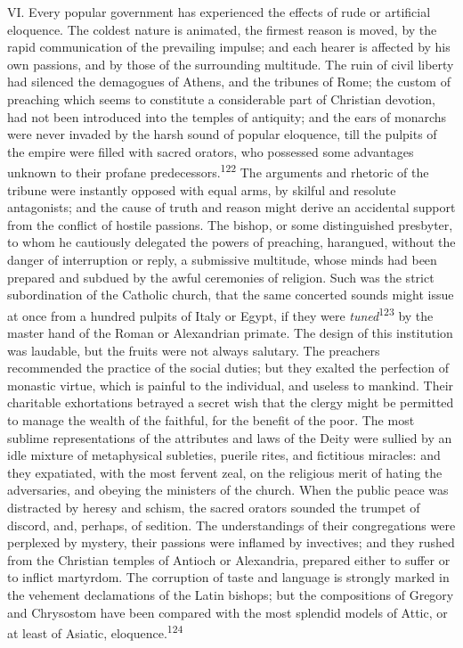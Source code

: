 
VI. Every popular government has experienced the effects of rude or
artificial eloquence. The coldest nature is animated, the firmest
reason is moved, by the rapid communication of the prevailing impulse;
and each hearer is affected by his own passions, and by those of the
surrounding multitude. The ruin of civil liberty had silenced the
demagogues of Athens, and the tribunes of Rome; the custom of preaching
which seems to constitute a considerable part of Christian devotion,
had not been introduced into the temples of antiquity; and the ears of
monarchs were never invaded by the harsh sound of popular eloquence,
till the pulpits of the empire were filled with sacred orators, who
possessed some advantages unknown to their profane predecessors.\textsuperscript{122}
The arguments and rhetoric of the tribune were instantly opposed with
equal arms, by skilful and resolute antagonists; and the cause of truth
and reason might derive an accidental support from the conflict of
hostile passions. The bishop, or some distinguished presbyter, to whom
he cautiously delegated the powers of preaching, harangued, without the
danger of interruption or reply, a submissive multitude, whose minds
had been prepared and subdued by the awful ceremonies of religion. Such
was the strict subordination of the Catholic church, that the same
concerted sounds might issue at once from a hundred pulpits of Italy or
Egypt, if they were \textit{tuned}\textsuperscript{123} by the master hand of the Roman or
Alexandrian primate. The design of this institution was laudable, but
the fruits were not always salutary. The preachers recommended the
practice of the social duties; but they exalted the perfection of
monastic virtue, which is painful to the individual, and useless to
mankind. Their charitable exhortations betrayed a secret wish that the
clergy might be permitted to manage the wealth of the faithful, for the
benefit of the poor. The most sublime representations of the attributes
and laws of the Deity were sullied by an idle mixture of metaphysical
subleties, puerile rites, and fictitious miracles: and they expatiated,
with the most fervent zeal, on the religious merit of hating the
adversaries, and obeying the ministers of the church. When the public
peace was distracted by heresy and schism, the sacred orators sounded
the trumpet of discord, and, perhaps, of sedition. The understandings
of their congregations were perplexed by mystery, their passions were
inflamed by invectives; and they rushed from the Christian temples of
Antioch or Alexandria, prepared either to suffer or to inflict
martyrdom. The corruption of taste and language is strongly marked in
the vehement declamations of the Latin bishops; but the compositions of
Gregory and Chrysostom have been compared with the most splendid models
of Attic, or at least of Asiatic, eloquence.\textsuperscript{124}

